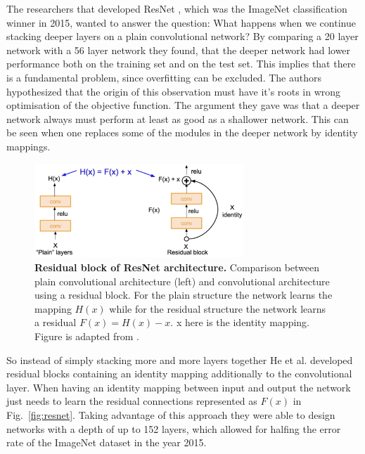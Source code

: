 The researchers that developed ResNet \parencite{he2015}, which was the ImageNet classification winner in 2015, wanted to answer the question: What happens when we continue stacking deeper layers on a plain convolutional network? By comparing a 20 layer network with a 56 layer network they found, that the deeper network had lower performance both on the training set and on the test set. This implies that there is a fundamental problem, since overfitting can be excluded. The authors hypothesized that the origin of this observation must have it's roots in wrong optimisation of the objective function. The argument they gave was that a deeper network always must perform at least as good as a shallower network. This can be seen when one replaces some of the modules in the deeper network by identity mappings.

\begin{figure}[h!]
	\centering
	\captionsetup{width=1\linewidth}
	\includegraphics[width=0.7\textwidth]{Figures/residual_modul.png}
	\caption{\textbf{Residual block of ResNet architecture.} Comparison between plain convolutional architecture (left) and convolutional architecture using a residual block. For the plain structure the network learns the mapping $H(x)$ while for the residual structure the network learns a residual $F(x) = H(x) - x$. x here is the identity mapping. Figure is adapted from \parencite{cs231}.}
	\label{fig:residual}
\end{figure}

So instead of simply stacking more and more layers together He et al. developed residual blocks containing an identity mapping additionally to the convolutional layer. When having an identity mapping between input and output the network just needs to learn the residual connections represented as $F(x)$ in Fig.~\ref{fig:resnet}.
Taking advantage of this approach they were able to design networks with a depth of up to 152 layers, which allowed for halfing the error rate of the ImageNet dataset in the year 2015. 

